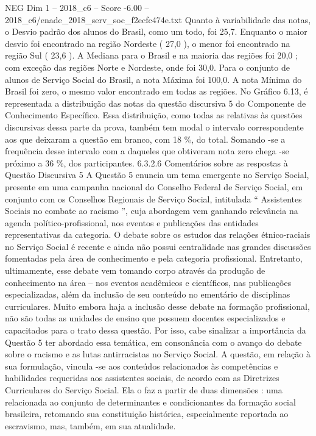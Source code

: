 \begin{textsample}{NEG Dim 1 – 2018\_c6 – Score -6.00 – 2018\_c6/enade\_2018\_serv\_soc\_f2ecfc474e.txt}
Quanto à variabilidade das notas, o Desvio padrão dos alunos do Brasil, como um todo, foi 25,7.
Enquanto o maior desvio foi encontrado na região Nordeste ( 27,0 ), o menor foi encontrado na região Sul ( 23,6 ).
A Mediana para o Brasil e na maioria das regiões foi 20,0 ; com exceção das regiões Norte e Nordeste, onde foi 30,0.
Para o conjunto de alunos de Serviço Social do Brasil, a nota Máxima foi 100,0.
A nota Mínima do Brasil foi zero, o mesmo valor encontrado em todas as regiões.
No Gráfico 6.13, é representada a distribuição das notas da questão discursiva 5 do Componente de Conhecimento Específico.
Essa distribuição, como todas as relativas às questões discursivas dessa parte da prova, também tem modal o intervalo correspondente aos que deixaram a questão em branco, com 18 \%, do total.
Somando -se a frequência desse intervalo com a daqueles que obtiveram nota zero chega -se próximo a 36 \%, dos participantes. 6.3.2.6 Comentários sobre as respostas à Questão Discursiva 5 A Questão 5 enuncia um tema emergente no Serviço Social, presente em uma campanha nacional do Conselho Federal de Serviço Social, em conjunto com os Conselhos Regionais de Serviço Social, intitulada “ Assistentes Sociais no combate ao racismo ”, cuja abordagem vem ganhando relevância na agenda político-profissional, nos eventos e publicações das entidades representativas da categoria.
O debate sobre os estudos das relações étnico-raciais no Serviço Social é recente e ainda não possui centralidade nas grandes discussões fomentadas pela área de conhecimento e pela categoria profissional.
Entretanto, ultimamente, esse debate vem tomando corpo através da produção de conhecimento na área – nos eventos acadêmicos e científicos, nas publicações especializadas, além da inclusão de seu conteúdo no ementário de disciplinas curriculares.
Muito embora haja a inclusão desse debate na formação profissional, não são todas as unidades de ensino que possuem docentes especializados e capacitados para o trato dessa questão.
Por isso, cabe sinalizar a importância da Questão 5 ter abordado essa temática, em consonância com o avanço do debate sobre o racismo e as lutas antirracistas no Serviço Social.
A questão, em relação à sua formulação, vincula -se aos conteúdos relacionados às competências e habilidades requeridas aos assistentes sociais, de acordo com as Diretrizes Curriculares do Serviço Social.
Ela o faz a partir de duas dimensões : uma relacionada ao conjunto de determinantes e condicionantes da formação social brasileira, retomando sua constituição histórica, especialmente reportada ao escravismo, mas, também, em sua atualidade.

\end{textsample}
